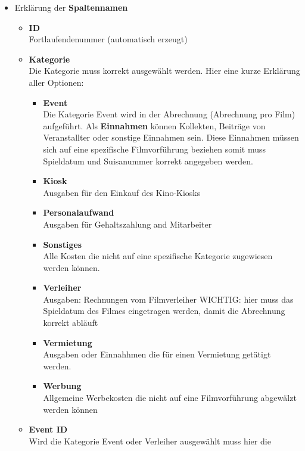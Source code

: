 \documentclass[
]{article}
\providecommand{\tightlist}{%
  \setlength{\itemsep}{0pt}\setlength{\parskip}{0pt}}
\begin{document}
\begin{itemize}
\tightlist
\item
  Erklärung der \textbf{Spaltennamen}

  \begin{itemize}
  \tightlist
  \item
    \textbf{ID}\\
    Fortlaufendenummer (automatisch erzeugt)
  \item
    \textbf{Kategorie}\\
    Die Kategorie muss korrekt ausgewählt werden. Hier eine kurze
    Erklärung aller Optionen:

    \begin{itemize}
    \tightlist
    \item
      \textbf{Event}\\
      Die Kategorie Event wird in der Abrechnung (Abrechnung pro Film)
      aufgeführt. Als \textbf{Einnahmen} können Kollekten, Beiträge von
      Veranstallter oder sonstige Einnahmen sein. Diese Einnahmen müssen
      sich auf eine spezifische Filmvorführung beziehen somit muss
      Spieldatum und Suisanummer korrekt angegeben werden.
    \item
      \textbf{Kiosk}\\
      Ausgaben für den Einkauf des Kino-Kiosks
    \item
      \textbf{Personalaufwand}\\
      Ausgaben für Gehaltszahlung and Mitarbeiter
    \item
      \textbf{Sonstiges}\\
      Alle Kosten die nicht auf eine spezifische Kategorie zugewiesen
      werden können.
    \item
      \textbf{Verleiher}\\
      Ausgaben: Rechnungen vom Filmverleiher WICHTIG: hier muss das
      Spieldatum des Filmes eingetragen werden, damit die Abrechnung
      korrekt abläuft
    \item
      \textbf{Vermietung}\\
      Ausgaben oder Einnahhmen die für einen Vermietung getätigt werden.
    \item
      \textbf{Werbung}\\
      Allgemeine Werbekosten die nicht auf eine Filmvorführung abgewälzt
      werden können
    \end{itemize}
  \item
    \textbf{Event ID}\\
    Wird die Kategorie Event oder Verleiher ausgewählt muss hier die

\end{itemize}
\end{itemize}
\end{document}
